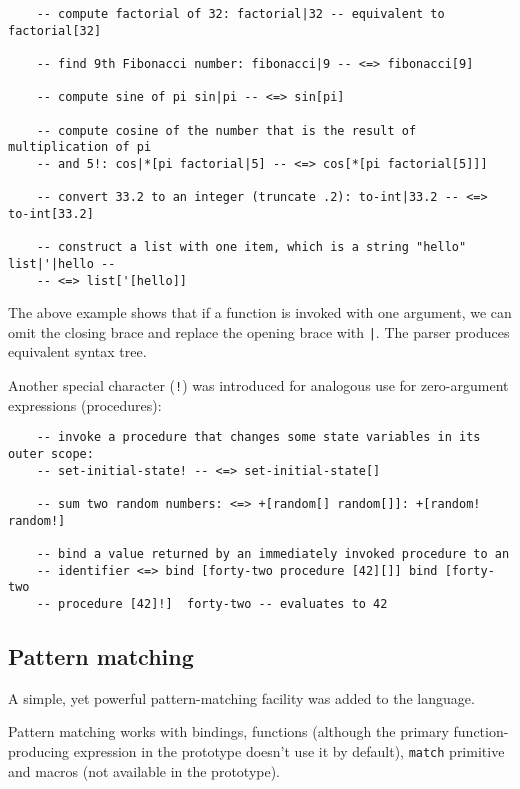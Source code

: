 \begin{lstlisting}
    -- compute factorial of 32: factorial|32 -- equivalent to factorial[32]
    
    -- find 9th Fibonacci number: fibonacci|9 -- <=> fibonacci[9]
    
    -- compute sine of pi sin|pi -- <=> sin[pi]
    
    -- compute cosine of the number that is the result of multiplication of pi
    -- and 5!: cos|*[pi factorial|5] -- <=> cos[*[pi factorial[5]]]
    
    -- convert 33.2 to an integer (truncate .2): to-int|33.2 -- <=> to-int[33.2]
    
    -- construct a list with one item, which is a string "hello" list|'|hello --
    -- <=> list['[hello]]
\end{lstlisting}

The above example shows that if a function is invoked with one argument, we can
omit the closing brace and replace the opening brace with \texttt{|}. The parser
produces equivalent syntax tree.

Another special character (\texttt{!}) was introduced for analogous use for
zero-argument expressions (procedures):
\begin{lstlisting}
    -- invoke a procedure that changes some state variables in its outer scope:
    -- set-initial-state! -- <=> set-initial-state[]
    
    -- sum two random numbers: <=> +[random[] random[]]: +[random! random!]
    
    -- bind a value returned by an immediately invoked procedure to an
    -- identifier <=> bind [forty-two procedure [42][]] bind [forty-two
    -- procedure [42]!]  forty-two -- evaluates to 42
\end{lstlisting}


\subsection{Pattern matching}
A simple, yet powerful pattern-matching facility was added to the language.

Pattern matching works with bindings, functions (although the primary
function-producing expression in the prototype doesn't use it by default),
\texttt{match} primitive and macros (not available in the prototype).

